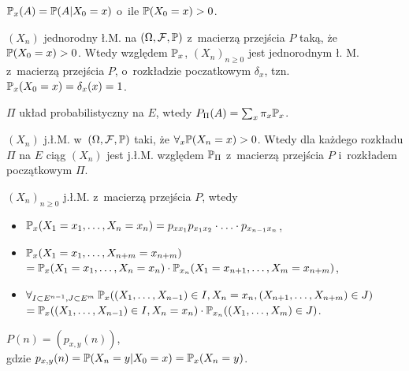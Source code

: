 



	\begin{definition}
		$\P_x(A) = \P(A | X_0 = x)$ o~ile $\P(X_0 = x) > 0$.
	\end{definition}
	
	\begin{fact}
		$(X_n)$ jednorodny ł.M. na $(\Omega, \F, \P)$ 
		z~macierzą przejścia $P$ taką, że $\P(X_0 = x)>0$.
		Wtedy względem $\P_x$, $(X_n)_{n \geq 0}$ jest jednorodnym
		ł. M. z~macierzą przejścia $P$, o~rozkładzie poczatkowym 
		$\delta_x$, tzn. $\P_x(X_0 = x) = \delta_x(x) = 1$.
	\end{fact}
	
	\begin{definition}
		$\Pi$ układ probabilistyczny na $E$, wtedy 
		$P_\Pi(A) = \sum_x \pi_x \P_x$.
	\end{definition}
	
	\begin{fact}
		$(X_n)$ j.ł.M. w~$(\Omega, \F, \P)$ taki, że 
		$\forall_x \P(X_n = x) > 0$.
		Wtedy dla każdego rozkładu $\Pi$ na $E$ ciąg $(X_n)$ jest 
		j.ł.M. względem $\P_\Pi$ z~macierzą przejścia $P$
		i~rozkładem początkowym $\Pi$.
	\end{fact}
	
	\begin{fact}
		$(X_n)_{n \geq 0}$ j.ł.M. z~macierzą przejścia $P$, wtedy
		\begin{itemize}
			\item $\P_x(X_1 = x_1, \ldots, X_n = x_n)
			= p_{x x_1} p_{x_1 x_2} \cdot \ldots\cdot p_{x_{n-1}x_n}$,
			\item $\P_x (X_1 = x_1, \ldots, X_{n+m} = x_{n+m})$
			\\${= \P_x (X_1 = x_1, \ldots, X_n = x_n)
			\cdot \P_{x_n}(X_1 = x_{n+1}, \ldots, X_m = x_{n+m})}$,
			\item $\forall_{I \subset E^{n-1}, J \subset E^m} \:
			\P_x( (X_1, \ldots, X_{n-1}) \in I, 
				X_n = x_n, 
				(X_{n+1}, \ldots, X_{n+m}) \in J )$\\
			${= \P_x( (X_1, \ldots, X_{n-1}) \in I, X_n = x_n)
				\cdot \P_{x_n}( (X_1, \ldots, X_m) \in J)}$.
		\end{itemize}

	\end{fact}
	
	\begin{definition}
		$P(n) = (p_{x,y}(n))$, 
		\\ gdzie $p_{x,y}(n) = \P(X_n = y | X_0 = x) = \P_x(X_n = y)$.
	\end{definition}
	
